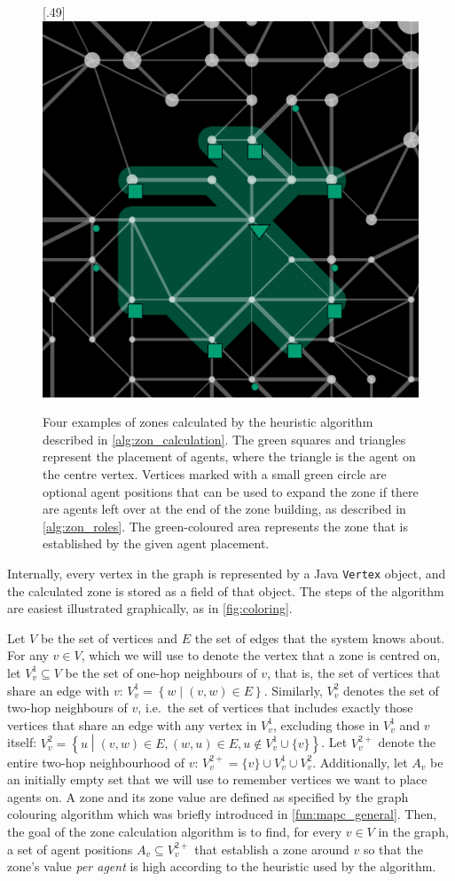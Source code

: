 \begin{figure}
  [.49\linewidth]{\includegraphics[width=.49\linewidth]{images/zone4.png}}
           \caption{Four examples of zones calculated by the heuristic algorithm described in \autoref{alg:zon_calculation}.
           The green squares and triangles represent the placement of agents, where the triangle is the agent on the centre vertex.
           Vertices marked with a small green circle are optional agent positions that can be used to expand the zone if there are agents left over at the end of the zone building, as described in \autoref{alg:zon_roles}.
           The green-coloured area represents the zone that is established by the given agent placement.}
  \label{fig:zones}
\end{figure}
Internally, every vertex in the graph is represented by a Java \lstinline{Vertex} object, and the calculated zone is stored as a field of that object.
The steps of the algorithm are easiest illustrated graphically, as in \autoref{fig:coloring}.
\begin{definition}
  Let $V$ be the set of vertices and $E$ the set of edges that the system knows about.
  For any $v \in V$, which we will use to denote the vertex that a zone is centred on, let $V_v^1 \subseteq V$ be the set of one-hop neighbours of $v$, that is, the set of vertices that share an edge with $v$: $V_v^1= \left\{w \middle|\left(v,w \right ) \in E\right\}$.
  Similarly, $V_v^2$ denotes the set of two-hop neighbours of $v$, i.e.\ the set of vertices that includes exactly those vertices that share an edge with any vertex in $V_v^1$, excluding those in $V_v^1$ and $v$ itself: $V_v^2= \left\{u \middle|\left(v,w \right ) \in E, \left(w,u \right ) \in E, u \notin V_v^1\cup\{v\}\right\}$.
  Let $V_v^{2+}$ denote the entire two-hop neighbourhood of $v$: $V_{v}^{2+} = \{v\} \cup V_v^1 \cup V_v^2$.
  Additionally, let $A_v$ be an initially empty set that we will use to remember vertices we want to place agents on.
  A zone and its zone value are defined as specified by the graph colouring algorithm which was briefly introduced in \autoref{fun:mapc_general}.
  Then, the goal of the zone calculation algorithm is to find, for every $v \in V$ in the graph, a set of agent positions $A_v \subseteq V_{v}^{2+}$ that establish a zone around $v$ so that the zone's value \emph{per agent} is high according to the heuristic used by the algorithm.
\end{definition}
